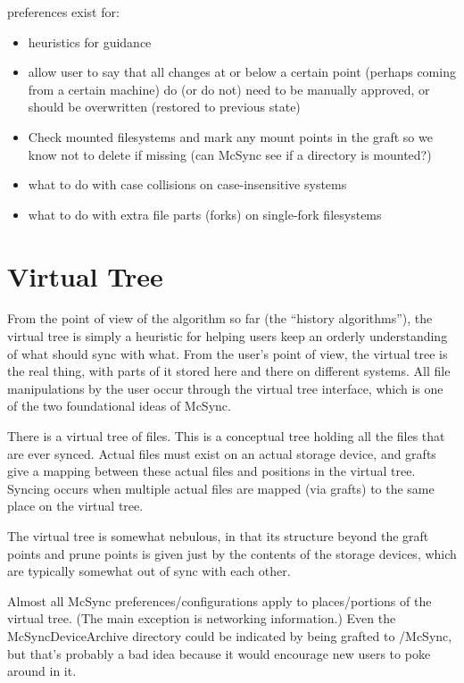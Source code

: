 \documentclass{book}
\begin{document}
preferences exist for:
\begin{itemize}
\item heuristics for guidance
\item allow user to say that all changes at or below a certain point (perhaps coming from a certain machine) do (or do not) need to be manually approved, or should be overwritten (restored to previous state)
\item Check mounted filesystems and mark any mount points in the graft so we know not to delete if missing (can McSync see if a directory is mounted?)
\item what to do with case collisions on case-insensitive systems
\item what to do with extra file parts (forks) on single-fork filesystems
\end{itemize}



\section{Virtual Tree}

From the point of view of the algorithm so far (the ``history algorithms''), the virtual tree is simply a heuristic for helping users keep an orderly understanding of what should sync with what.  From the user's point of view, the virtual tree is the real thing, with parts of it stored here and there on different systems.  All file manipulations by the user occur through the virtual tree interface, which is one of the two foundational ideas of McSync.

There is a virtual tree of files.
This is a conceptual tree holding all the files that are ever synced.
Actual files must exist on an actual storage device, and grafts give a mapping between these actual files and positions in the virtual tree.
Syncing occurs when multiple actual files are mapped (via grafts) to the same place on the virtual tree.

The virtual tree is somewhat nebulous, in that its structure beyond the graft points and prune points is given just by the contents of the storage devices, which are typically somewhat out of sync with each other.

Almost all McSync preferences/configurations apply to places/portions of the virtual tree.  (The main exception is networking information.)  Even the McSyncDeviceArchive directory could be indicated by being grafted to /McSync, but that's probably a bad idea because it would encourage new users to poke around in it.
\end{document}
